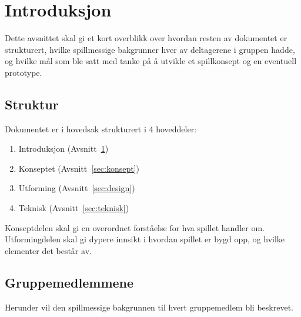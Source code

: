 \section{Introduksjon}\label{sec:intro}
Dette avsnittet skal gi et kort overblikk over hvordan resten av
dokumentet er strukturert, hvilke spillmessige bakgrunner hver av
deltagerene i gruppen hadde, og hvilke mål som ble satt med tanke på å
utvikle et spillkonsept og en eventuell prototype.

\subsection{Struktur}
Dokumentet er i hovedsak strukturert i 4 hoveddeler:
\begin{enumerate}
	\item Introduksjon (Avsnitt~\ref{sec:intro})
	\item Konseptet (Avsnitt~\ref{sec:konsept})
	\item Utforming (Avsnitt~\ref{sec:design})
	\item Teknisk (Avsnitt~\ref{sec:teknisk})
\end{enumerate}
Konseptdelen skal gi en overordnet forståelse for hva spillet handler
om. Utformingdelen skal gi dypere innsikt i hvordan spillet er bygd opp,
og hvilke elementer det består av.

\subsection{Gruppemedlemmene}
Herunder vil den spillmessige bakgrunnen til hvert gruppemedlem bli
beskrevet.

